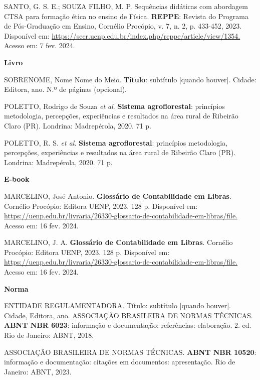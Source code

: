
SANTO, G. S. E.; SOUZA FILHO, M. P. Sequências didáticas com abordagem CTSA para formação ética no ensino de Física. \textbf{REPPE}: Revista do Programa de Pós-Graduação em Ensino, Cornélio Procópio, v. 7, n. 2, p. 433-452, 2023. Disponível em: \url{https://seer.uenp.edu.br/index.php/reppe/article/view/1354.} Acesso em: 7 fev. 2024.

\noindent\textbf{Livro}

SOBRENOME, Nome Nome do Meio. \textbf{Título}: subtítulo [quando houver]. Cidade: Editora, ano. \textcolor{exemplo}{N.º de páginas (opcional).}

POLETTO, Rodrigo de Souza \textit{et al}. \textbf{Sistema agroflorestal}: princípios metodologia, percepções, experiências e resultados na área rural de Ribeirão Claro (PR). Londrina: Madrepérola, 2020. 71 p.

POLETTO, R. S. \textit{et al}. \textbf{Sistema agroflorestal}: princípios metodologia, percepções, experiências e resultados na área rural de Ribeirão Claro (PR). Londrina: Madrepérola, 2020. 71 p.

\noindent\textbf{E-book}

MARCELINO, José Antonio. \textbf{Glossário de Contabilidade em Libras}. Cornélio Procópio: Editora UENP, 2023. 128 p. Disponível em: \url{https://uenp.edu.br/livraria/26330-glossario-de-contabilidade-em-libras/file.} Acesso em: 16 fev. 2024.

MARCELINO, J. A. \textbf{Glossário de Contabilidade em Libras}. Cornélio Procópio: Editora UENP, 2023. 128 p. Disponível em: \url{https://uenp.edu.br/livraria/26330-glossario-de-contabilidade-em-libras/file.} Acesso em: 16 fev. 2024.

\noindent\textbf{Norma}

ENTIDADE REGULAMENTADORA. Título: subtítulo [quando houver]. Cidade, Editora, ano.
ASSOCIAÇÃO BRASILEIRA DE NORMAS TÉCNICAS. \textbf{ABNT NBR 6023}: informação e documentação: referências: elaboração. 2. ed. Rio de Janeiro: ABNT, 2018.

ASSOCIAÇÃO BRASILEIRA DE NORMAS TÉCNICAS. \textbf{ABNT NBR 10520}: informação e documentação: citações em documentos: apresentação. Rio de Janeiro: ABNT, 2023.